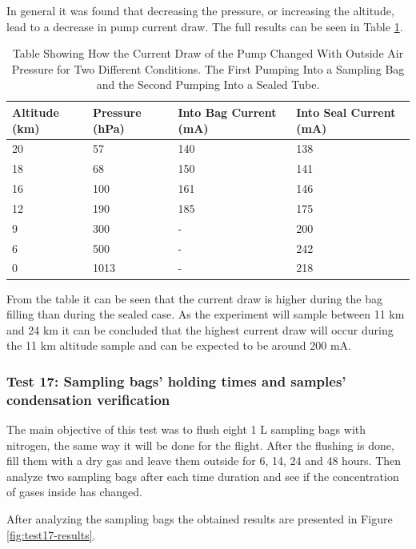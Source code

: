 \documentclass[a4paper,12pt,twoside]{article}
\begin{document}
In general it was found that decreasing the pressure, or increasing the altitude, lead to a decrease in pump current draw. The full results can be seen in Table \ref{tab:pumpcurrentpressure}. 

\begin{table}[H]
\centering

\begin{tabular}{|l|l|l|l|}
\hline
\textbf{Altitude (km)} & \textbf{Pressure (hPa)} & \textbf{Into Bag Current (mA)} & \textbf{Into Seal Current (mA)} \\ \hline
20 & 57 & 140 & 138 \\ \hline
18 & 68 & 150 & 141 \\ \hline
16 & 100 & 161 & 146 \\ \hline
12 & 190 & 185 & 175 \\ \hline
9 & 300 & - & 200 \\ \hline
6 & 500 & - & 242 \\ \hline
0 & 1013 & - & 218 \\ \hline
\end{tabular}
\caption{Table Showing How the Current Draw of the Pump Changed With Outside Air Pressure for Two Different Conditions. The First Pumping Into a Sampling Bag and the Second Pumping Into a Sealed Tube.}
\label{tab:pumpcurrentpressure}
\end{table}

From the table it can be seen that the current draw is higher during the bag filling than during the sealed case. As the experiment will sample between 11 km and 24 km it can be concluded that the highest current draw will occur during the 11 km altitude sample and can be expected to be around 200 mA. 

\subsubsection{Test 17: Sampling bags' holding times and samples' condensation verification}
\label{sec:test17result}

The main objective of this test was to flush eight 1 L sampling bags with nitrogen, the same way it will be done for the flight. After the flushing is done, fill them with a dry gas and leave them outside for 6, 14, 24 and 48 hours. Then analyze two sampling bags after each time duration and see if the concentration of gases inside has changed. 

After analyzing the sampling bags the obtained results are presented in Figure \ref{fig:test17-results}.
\end{document}
